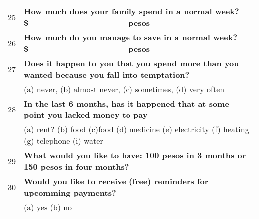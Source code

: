 \begin{tabular}{cl}
25    & \textbf{How much does your family spend in a normal week?   \$\_\_\_\_\_\_\_\_\_\_\_\_\_\_ pesos} \\
26    & \textbf{How much do you manage to save in a normal week?   \$\_\_\_\_\_\_\_\_\_\_\_\_\_\_ pesos} \\
27    & \textbf{Does it happen to you that you spend more than you wanted because you fall into temptation?} \\
      & (a) never, (b) almost never, (c) sometimes, (d) very often \\
28    & \textbf{In the last 6 months, has it happened that at some point you lacked money to pay} \\
      & (a) rent?    (b) food    (c)food   (d) medicine  (e) electricity   (f) heating   (g) telephone    (i) water \\
29    & \textbf{What would you like to have: 100 pesos in 3 months or 150 pesos in four months?} \\
30    & \textbf{Would you like to receive (free) reminders for upcomming payments?} \\
      & (a) yes  (b) no \\
\bottomrule
\end{tabular}%
